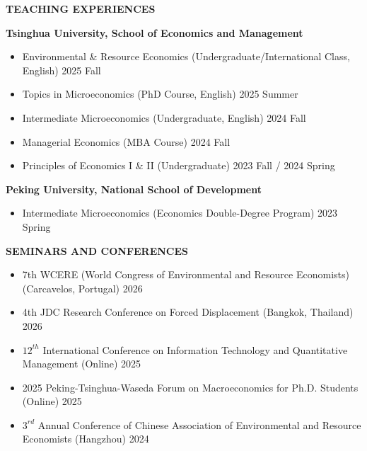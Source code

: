 \documentclass[UTF8]{ctexbook}
\begin{document}
\vspace{12pt}

\begin{center}
    \textbf{TEACHING EXPERIENCES}
\end{center}

\textbf{Tsinghua University, School of Economics and Management}

\begin{itemize}[leftmargin=1.5em, itemsep=2pt, topsep=4pt]
    \item Environmental \& Resource Economics (Undergraduate/International Class, English) \hfill 2025 Fall
    \item Topics in Microeconomics (PhD Course, English) \hfill 2025 Summer
    \item Intermediate Microeconomics (Undergraduate, English) \hfill 2024 Fall
    \item Managerial Economics (MBA Course) \hfill 2024 Fall
    \item Principles of Economics I \& II (Undergraduate) \hfill 2023 Fall / 2024 Spring
\end{itemize}

\textbf{Peking University, National School of Development}

\begin{itemize}[leftmargin=1.5em, itemsep=2pt, topsep=4pt]
    \item Intermediate Microeconomics (Economics Double-Degree Program) \hfill 2023 Spring
\end{itemize}

\vspace{12pt}

\begin{center}
    \textbf{SEMINARS AND CONFERENCES}
\end{center}

\begin{itemize}[leftmargin=1.5em, itemsep=2pt, topsep=4pt]
    \item 7th WCERE (World Congress of Environmental and Resource Economists) (Carcavelos, Portugal) \hfill 2026
    \item 4th JDC Research Conference on Forced Displacement (Bangkok, Thailand) \hfill 2026
    \item $12^{th}$ International Conference on Information Technology and Quantitative Management (Online) \hfill 2025
    \item 2025 Peking-Tsinghua-Waseda Forum on Macroeconomics for Ph.D. Students (Online) \hfill 2025
    \item $3^{rd}$ Annual Conference of Chinese Association of Environmental and Resource Economists (Hangzhou) \hfill 2024
\end{itemize}
\end{document}
